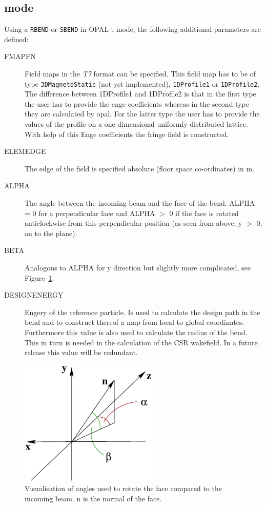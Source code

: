 \subsection{\opalt mode}
\label{sec:quadrupole-t}
Using a \texttt{RBEND} or \texttt{SBEND} in OPAL-t mode, the following additional parameters are defined:
\begin{description}
\item[FMAPFN]
  Field maps in the {\em T7} format can be specified. This field map has to be of type \texttt{3DMagnetoStatic}
  (not yet implemented), \texttt{1DProfile1} or \texttt{1DProfile2}. The difference between 1DProfile1 and 1DProfile2
  is that in the first type the user has to provide the enge coefficients whereas in the second type they are
  calculated by opal. For the latter type the user has to provide the values of the profile on a one dimensional
  uniformly distributed lattice. With help of this Enge coefficients the fringe field is constructed.
\item[ELEMEDGE]
  The edge of the field is specified absolute (floor space co-ordinates) in m.
\item[ALPHA]
  The angle between the incoming beam and the face of the bend. ALPHA = 0 for a perpendicular face and ALPHA $>$ 0 if
  the face is rotated anticlockwise from this perpendicular position (as seen from above, y $>$ 0, on to the plane).
\item[BETA]
  Analogous to ALPHA for y direction but slightly more complicated, see Figure~\ref{rbendangle}.
\item[DESIGNENERGY]
  Engery of the reference particle. Is used to calculate the design path in the bend and to construct thereof a map
  from local to global coordinates. Furthermore this value is also used to calculate the radius of the bend. This in
  turn is needed in the calculation of the CSR wakefield. In a future release this value will be redundant.
\end{description}
\begin{figure}
  \begin{center}
  \includegraphics[origin=bl,height=60mm,angle=0]{./figures/rbendangle.pdf}
  \caption{\label{rbendangle}
    Visualisation of angles used to rotate the face compared to the incoming beam. n is the normal of the face.
  }
  \end{center}
%
\end{figure}

